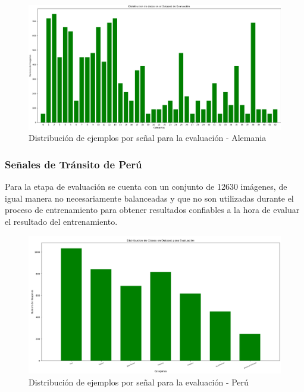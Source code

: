 		\begin{figure}[H]
			\includegraphics[width=1\textwidth]{images/desarrollo/histograms/initialTest12630}
			\begin{center}
			\caption{\small{Distribución de ejemplos por señal para la evaluación - Alemania}}
			\vspace{-1em}
		{\small{\fontsize{10}{16.8}\selectfont {Fuente propia}}}
			\end{center}
			\vspace{-1.5em}
		\end{figure}

		\subsubsection{Señales de Tránsito de Perú}
		Para la etapa de evaluación se cuenta con un conjunto de 12630 imágenes, de igual manera no necesariamente balanceadas y que no son utilizadas durante el proceso de entrenamiento para obtener resultados confiables a la hora de evaluar el resultado del entrenamiento. 

		\begin{figure}[H]
			\includegraphics[width=1\textwidth]{images/desarrollo/histograms/PeruinitialTest4698}
			\begin{center}
			\caption{\small{Distribución de ejemplos por señal para la evaluación - Perú}}
			\vspace{-1em}
		{\small{\fontsize{10}{16.8}\selectfont {Fuente propia}}}
			\end{center}
			\vspace{-1.5em}
		\end{figure}

